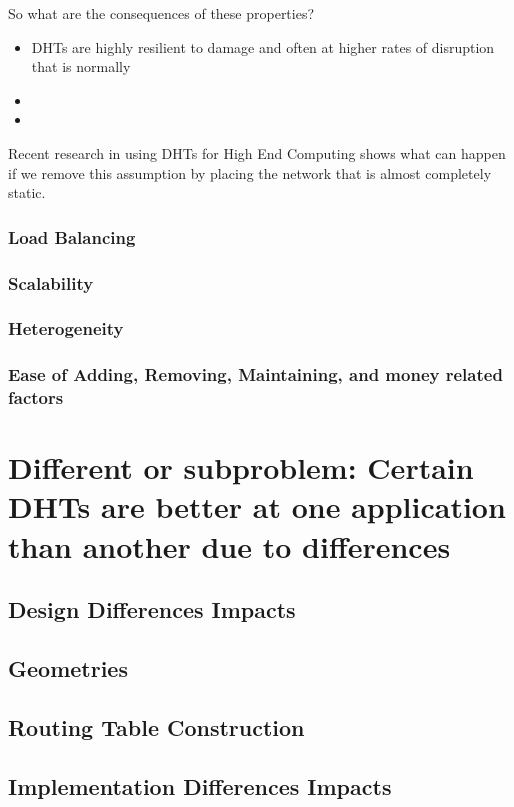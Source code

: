 \documentclass[10pt,letterpaper]{report}
\begin{document}
So what are the consequences of these properties?
\begin{itemize}
	\item DHTs are highly resilient to damage and often at higher rates of disruption that is normally
	\item 
	\item 
\end{itemize}

Recent research in using DHTs for High End Computing \cite{zht} shows what can happen if we remove this assumption by placing the network that is almost completely static.



\subsubsection{Load Balancing}
\subsubsection{Scalability}
\subsubsection{Heterogeneity}
\subsubsection{Ease of Adding, Removing, Maintaining, and money related factors}

\section{Different or subproblem: Certain DHTs are better at one application than another due to differences}
\subsection{Design Differences Impacts}
\subsection{Geometries}
\subsection{Routing Table Construction}
\subsection{Implementation Differences Impacts}
\end{document}
